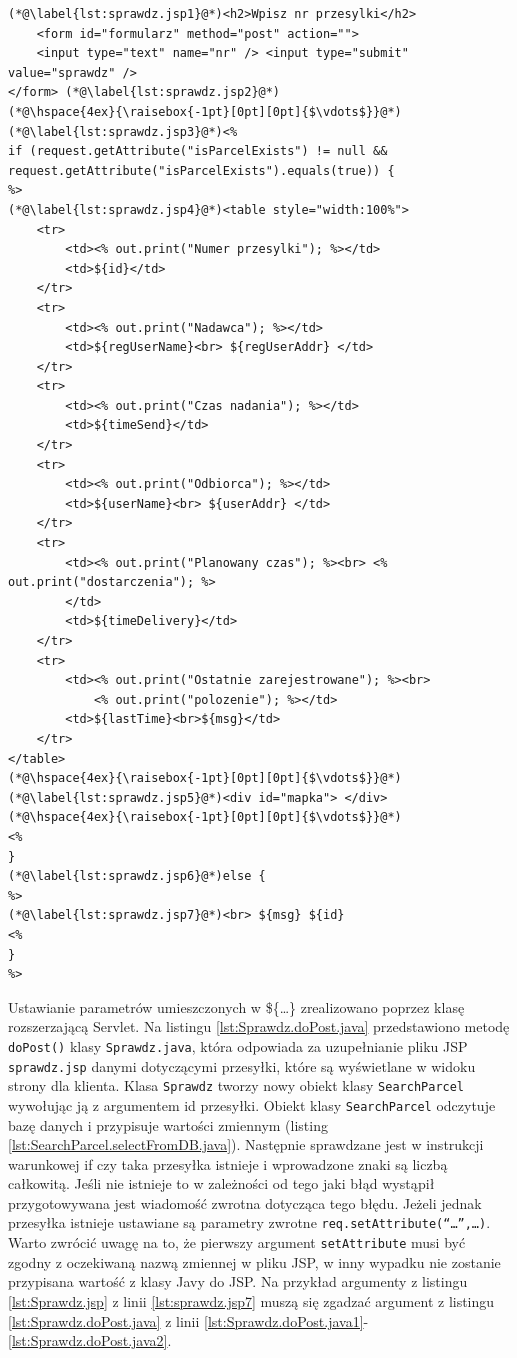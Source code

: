 \documentclass[eng,printmode,oneside]{mgr}
\begin{document}
\begin{lstlisting}[caption=Ciało pliku JavaServlet Pages -
sprawdz.jsp,label=lst:Sprawdz.jsp] 
(*@\label{lst:sprawdz.jsp1}@*)<h2>Wpisz nr przesylki</h2> 
	<form id="formularz" method="post" action=""> 
	<input type="text" name="nr" /> <input type="submit" value="sprawdz" />
</form> (*@\label{lst:sprawdz.jsp2}@*)
(*@\hspace{4ex}{\raisebox{-1pt}[0pt][0pt]{$\vdots$}}@*)
(*@\label{lst:sprawdz.jsp3}@*)<%
if (request.getAttribute("isParcelExists") != null &&
request.getAttribute("isParcelExists").equals(true)) {
%>
(*@\label{lst:sprawdz.jsp4}@*)<table style="width:100%">
	<tr>
		<td><% out.print("Numer przesylki"); %></td>
		<td>${id}</td>
	</tr>
	<tr>
		<td><% out.print("Nadawca"); %></td>
		<td>${regUserName}<br> ${regUserAddr} </td>
	</tr>
	<tr>
		<td><% out.print("Czas nadania"); %></td>
		<td>${timeSend}</td>
	</tr>
	<tr>
		<td><% out.print("Odbiorca"); %></td>
		<td>${userName}<br> ${userAddr} </td>
	</tr>
	<tr>
		<td><% out.print("Planowany czas"); %><br> <% out.print("dostarczenia"); %>
		</td>
		<td>${timeDelivery}</td>
	</tr>
	<tr>
		<td><% out.print("Ostatnie zarejestrowane"); %><br>
			<% out.print("polozenie"); %></td>
		<td>${lastTime}<br>${msg}</td>
	</tr>
</table>
(*@\hspace{4ex}{\raisebox{-1pt}[0pt][0pt]{$\vdots$}}@*)
(*@\label{lst:sprawdz.jsp5}@*)<div id="mapka"> </div>
(*@\hspace{4ex}{\raisebox{-1pt}[0pt][0pt]{$\vdots$}}@*)
<%
}
(*@\label{lst:sprawdz.jsp6}@*)else {
%>
(*@\label{lst:sprawdz.jsp7}@*)<br> ${msg} ${id}
<% 
}
%>
\end{lstlisting}

Ustawianie parametrów umieszczonych w \$\{\ldots\} zrealizowano
poprzez klasę rozszerzającą Servlet. Na listingu \ref{lst:Sprawdz.doPost.java}
przedstawiono metodę \texttt{doPost()} klasy \texttt{Sprawdz.java}, która odpowiada za uzupełnianie
pliku JSP \texttt{sprawdz.jsp} danymi dotyczącymi przesyłki, które są
wyświetlane w widoku strony dla klienta. Klasa \texttt{Sprawdz} tworzy nowy
obiekt klasy \texttt{SearchParcel} wywołując ją z argumentem id przesyłki.
Obiekt klasy \texttt{SearchParcel} odczytuje bazę danych i przypisuje
wartości zmiennym (listing \ref{lst:SearchParcel.selectFromDB.java}). Następnie sprawdzane
jest w instrukcji warunkowej if czy taka przesyłka istnieje i wprowadzone znaki są
liczbą całkowitą. Jeśli nie istnieje to w zależności od tego jaki błąd wystąpił
przygotowywana jest wiadomość zwrotna dotycząca tego błędu. Jeżeli jednak
przesyłka istnieje ustawiane są parametry zwrotne
\texttt{req.setAttribute(``\ldots'',\ldots)}. Warto zwrócić uwagę na to, że
pierwszy argument \texttt{setAttribute} musi być zgodny z oczekiwaną nazwą
zmiennej w pliku JSP, w inny wypadku nie zostanie przypisana wartość z klasy
Javy do JSP. Na przykład argumenty z listingu \ref{lst:Sprawdz.jsp} z linii
\ref{lst:sprawdz.jsp7} muszą się zgadzać argument z listingu
\ref{lst:Sprawdz.doPost.java} z linii \ref{lst:Sprawdz.doPost.java1}-\ref{lst:Sprawdz.doPost.java2}.
\end{document}
